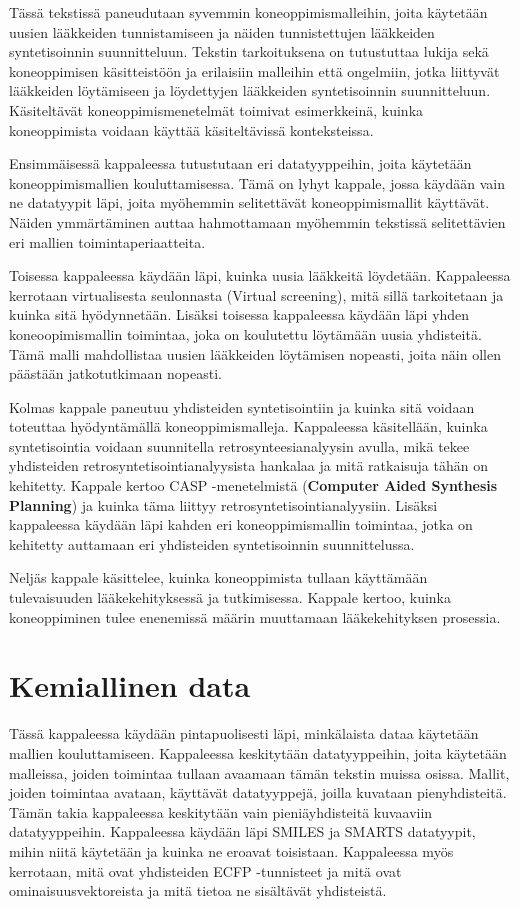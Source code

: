 \documentclass[finnish,twoside,censored,tkt,sw-line]{HYthesisML}
\begin{document}
Tässä tekstissä paneudutaan syvemmin koneoppimismalleihin, joita käytetään uusien lääkkeiden tunnistamiseen ja näiden tunnistettujen lääkkeiden syntetisoinnin suunnitteluun.
Tekstin tarkoituksena on tutustuttaa lukija sekä koneoppimisen käsitteistöön ja erilaisiin malleihin että ongelmiin, jotka liittyvät lääkkeiden löytämiseen ja löydettyjen lääkkeiden syntetisoinnin suunnitteluun.
Käsiteltävät koneoppimismenetelmät toimivat esimerkkeinä, kuinka koneoppimista voidaan käyttää käsiteltävissä konteksteissa.

Ensimmäisessä kappaleessa tutustutaan eri datatyyppeihin, joita käytetään koneoppimismallien kouluttamisessa.
Tämä on lyhyt kappale, jossa käydään vain ne datatyypit läpi, joita myöhemmin selitettävät koneoppimismallit käyttävät.
Näiden ymmärtäminen auttaa hahmottamaan myöhemmin tekstissä selitettävien eri mallien toimintaperiaatteita.

Toisessa kappaleessa käydään läpi, kuinka uusia lääkkeitä löydetään.
Kappaleessa kerrotaan virtualisesta seulonnasta (Virtual screening), mitä sillä tarkoitetaan ja kuinka sitä hyödynnetään.
Lisäksi toisessa kappaleessa käydään läpi yhden koneoopimismallin toimintaa, joka on koulutettu löytämään uusia yhdisteitä.
Tämä malli mahdollistaa uusien lääkkeiden löytämisen nopeasti, joita näin ollen päästään jatkotutkimaan nopeasti.

Kolmas kappale paneutuu yhdisteiden syntetisointiin ja kuinka sitä voidaan toteuttaa hyödyntämällä koneoppimismalleja.
Kappaleessa käsitellään, kuinka syntetisointia voidaan suunnitella retrosynteesianalyysin avulla, mikä tekee yhdisteiden retrosyntetisointianalyysista hankalaa ja mitä ratkaisuja tähän on kehitetty.
Kappale kertoo CASP -menetelmistä (\textbf{Computer Aided Synthesis Planning}) ja kuinka täma liittyy retrosyntetisointianalyysiin.
Lisäksi kappaleessa käydään läpi kahden eri koneoppimismallin toimintaa, jotka on kehitetty auttamaan eri yhdisteiden syntetisoinnin suunnittelussa.

Neljäs kappale käsittelee, kuinka koneoppimista tullaan käyttämään tulevaisuuden lääkekehityksessä ja tutkimisessa.
Kappale kertoo, kuinka koneoppiminen tulee enenemissä määrin muuttamaan lääkekehityksen prosessia.

\chapter{Kemiallinen data}

Tässä kappaleessa käydään pintapuolisesti läpi, minkälaista dataa käytetään mallien kouluttamiseen.
Kappaleessa keskitytään datatyyppeihin, joita käytetään malleissa, joiden toimintaa tullaan avaamaan tämän tekstin muissa osissa.
Mallit, joiden toimintaa avataan, käyttävät datatyyppejä, joilla kuvataan pienyhdisteitä.
Tämän takia kappaleessa keskitytään vain pieniäyhdisteitä kuvaaviin datatyyppeihin.
Kappaleessa käydään läpi SMILES ja SMARTS datatyypit, mihin niitä käytetään ja kuinka ne eroavat toisistaan.
Kappaleessa myös kerrotaan, mitä ovat yhdisteiden ECFP -tunnisteet ja mitä ovat ominaisuusvektoreista ja mitä tietoa ne sisältävät yhdisteistä.
\end{document}
